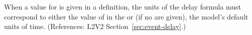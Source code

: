 When a value for  is given in a \Event definition, the units
of the delay formula must correspond to either the value of
 in the \Event or (if no  are given), the
model's default units of time.  (References: L2V2
Section~\ref{sec:event-delay}.)
